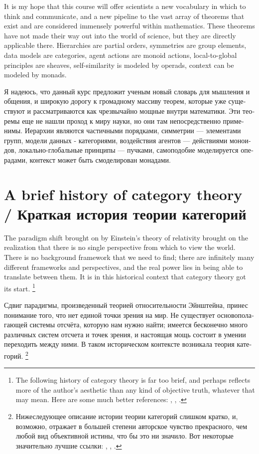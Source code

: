 \documentclass[a4paper]{book}
\theoremstyle{myth}
\begin{document}
\begin{russian}
It is my hope that this course will offer scientists a new vocabulary in which to think and communicate, and a new pipeline to the vast array of theorems that exist and are considered immensely powerful within mathematics. These theorems have not made their way out into the world of science, but they are directly applicable there. Hierarchies are partial orders, symmetries are group elements, data models are categories, agent actions are monoid actions, local-to-global principles are sheaves, self-similarity is modeled by operads, context can be modeled by monads.

Я надеюсь, что данный курс предложит ученым новый словарь для мышления и общения, и широкую дорогу к громадному массиву теорем, которые уже существуют и рассматриваются как чрезвычайно мощные внутри математики. Эти теоремы еще не нашли проход к миру науки, но они там непосредственно применимы. Иерархии являются частичными порядками, симметрии — элементами групп, модели данных - категориями, воздействия агентов — действиями моноидов, локально-глобальные принципы — пучками, самоподобие моделируется операдами, контекст может быть смоделирован монадами. 


\section{A brief history of category theory /  Краткая история теории категорий }

The paradigm shift brought on by Einstein's theory of relativity brought on the realization that there is no single perspective from which to view the world. There is no background framework that we need to find; there are infinitely many different frameworks and perspectives, and the real power lies in being able to translate between them. It is in this historical context that category theory got its start.%
\footnote{The following history of category theory is far too brief, and perhaps reflects more of the author's aesthetic than any kind of objective truth, whatever that may mean. Here are some much better references: \cite{Kro}, \cite{Mar1}, \cite{LM}.}


Сдвиг парадигмы, произведенный теорией относительности Эйнштейна, принес понимание того, что нет единой точки зрения на мир. Не существует основополагающей системы отсчёта, которую нам нужно найти; имеется бесконечно много различных систем отсчета и точек зрения, и настоящая мощь состоит в умении переходить между ними. В таком историческом контексте возникала теория категорий.%
\footnote{Нижеследующее описание истории теории категорий слишком кратко, и, возможно, отражает в большей степени авторское чувство прекрасного, чем любой вид объективной истины, что бы это ни значило. Вот некоторые значительно лучшие ссылки: \cite{Kro}, \cite{Mar1}, \cite{LM}.}%


\end{russian}
\end{document}
